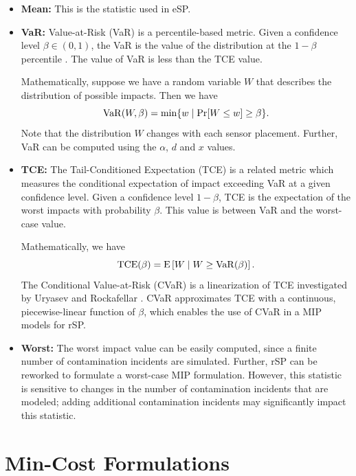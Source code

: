 \begin{itemize}
\item {\bfseries Mean:} This is the statistic used in eSP.


\item {\bfseries VaR:} Value-\/at-\/Risk (VaR) is a percentile-\/based metric. Given a confidence level $\beta\in(0,1)$, the VaR is the value of the distribution at the $1-\beta$ percentile \cite{TopVlaZen02}. The value of VaR is less than the TCE value.

Mathematically, suppose we have a random variable $W$ that describes the distribution of possible impacts. Then we have \[ {\rm VaR}(W,\beta) = \min \{ w \mid \Pr[W \le w] \ge \beta \}. \] Note that the distribution $W$ changes with each sensor placement. Further, VaR can be computed using the $\alpha$, $d$ and $x$ values.


\item {\bfseries TCE:} The Tail-\/Conditioned Expectation (TCE) is a related metric which measures the conditional expectation of impact exceeding VaR at a given confidence level. Given a confidence level $1-\beta$, TCE is the expectation of the worst impacts with probability $\beta$. This value is between VaR and the worst-\/case value.

Mathematically, we have \[ {\rm TCE}(\beta) = {\rm E}\left[ W \mid W \ge {\rm VaR}(\beta) \right]. \] The Conditional Value-\/at-\/Risk (CVaR) is a linearization of TCE investigated by Uryasev and Rockafellar \cite{rockafellar02cvar}. CVaR approximates TCE with a continuous, piecewise-\/linear function of $\beta$, which enables the use of CVaR in a MIP models for rSP.


\item {\bfseries Worst:} The worst impact value can be easily computed, since a finite number of contamination incidents are simulated. Further, rSP can be reworked to formulate a worst-\/case MIP formulation. However, this statistic is sensitive to changes in the number of contamination incidents that are modeled; adding additional contamination incidents may significantly impact this statistic.


\end{itemize}

\section{Min-\/Cost Formulations}\label{formulations_formulationsMinCost}

